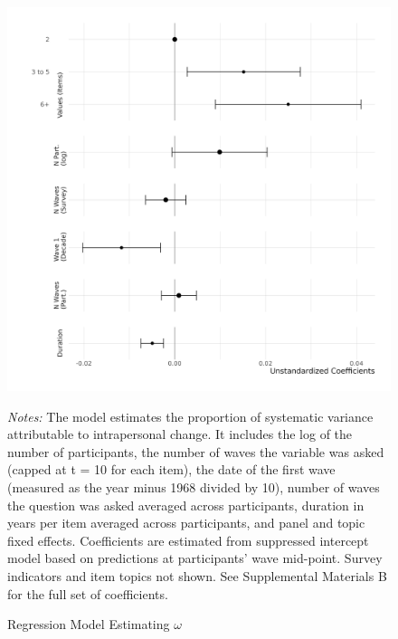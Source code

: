 \documentclass[
  12pt,
]{article}
\begin{document}
\newpage

\begin{figure}[ht]
\begin{center}
\caption{Regression Model Estimating $\omega$}

\includegraphics{../figures/figure_2.png}

\end{center}
\footnotesize{\textit{Notes:} The model estimates the proportion of systematic variance attributable to intrapersonal change. It includes the log of the number of participants, the number of waves the variable was asked (capped at t = 10 for each item), the date of the first wave (measured as the year minus 1968 divided by 10), number of waves the question was asked averaged across participants, duration in years per item averaged across participants, and panel and topic fixed effects. Coefficients are estimated from suppressed intercept model based on predictions at participants' wave mid-point. Survey indicators and item topics not shown. See Supplemental Materials B for the full set of coefficients.}
\end{figure}

\newpage
\end{document}
